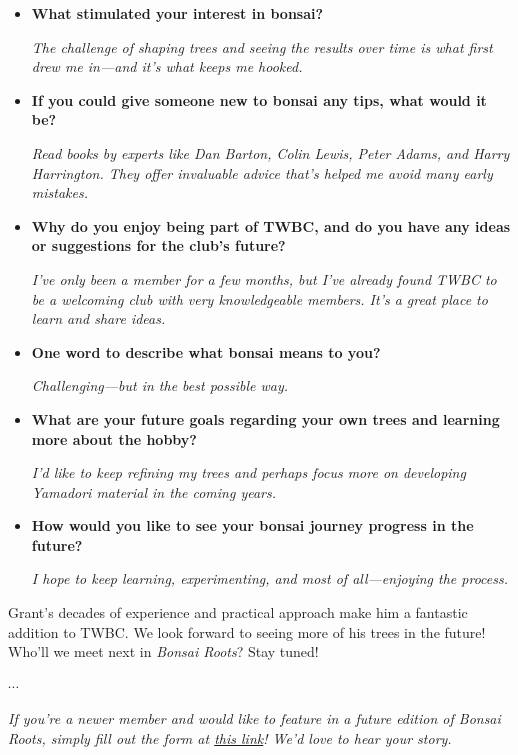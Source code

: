 \begin{itemize}
    \item \textbf{What stimulated your interest in bonsai?}

    \emph{The challenge of shaping trees and seeing the results over time is what first drew me in---and it's what keeps me hooked.}

    \item \textbf{If you could give someone new to bonsai any tips, what would it be?}

    \emph{Read books by experts like Dan Barton, Colin Lewis, Peter Adams, and Harry Harrington. They offer invaluable advice that's helped me avoid many early mistakes.}

    \item \textbf{Why do you enjoy being part of TWBC, and do you have any ideas or suggestions for the club's future?}

    \emph{I've only been a member for a few months, but I've already found TWBC to be a welcoming club with very knowledgeable members. It's a great place to learn and share ideas.}

    \item \textbf{One word to describe what bonsai means to you?}

    \emph{Challenging---but in the best possible way.}

    \item \textbf{What are your future goals regarding your own trees and learning more about the hobby?}

    \emph{I'd like to keep refining my trees and perhaps focus more on developing Yamadori material in the coming years.}

    \item \textbf{How would you like to see your bonsai journey progress in the future?}

    \emph{I hope to keep learning, experimenting, and most of all---enjoying the process.}
\end{itemize}

Grant's decades of experience and practical approach make him a fantastic addition to TWBC.
We look forward to seeing more of his trees in the future!
Who'll we meet next in \emph{Bonsai Roots}? Stay tuned!

\begin{center}
    $\cdots$
\end{center}

\noindent
\emph{If you're a newer member and would like to feature in a future edition of Bonsai Roots, simply fill out the form at \href{https://forms.gle/quVXa4L8rhpnT5kr6}{this link}! We'd love to hear your story.}
\closearticle

